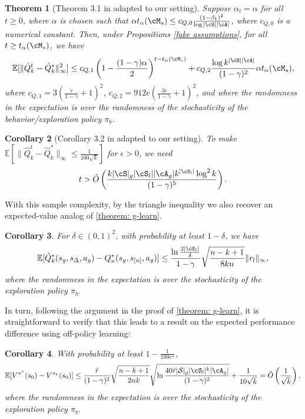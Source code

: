 \documentclass{article}
\theoremstyle{plain}
\newtheorem{theorem}{Theorem}[section]
\newtheorem{corollary}[theorem]{Corollary}
\theoremstyle{definition}
\def\E{\mathbb{E}}
\begin{document}
\begin{theorem}[Theorem 3.1 in \citet{chen2021lyapunov} adapted to our setting] Suppose $\alpha_t = \alpha$ for all $t\geq 0$, where $\alpha$ is chosen such that $\alpha t_\alpha(\cM_{s}) \leq c_{Q,0} \frac{(1-\beta_1)^2}{\log |\cS||\cA|}$, where $c_{Q,0}$ is a numerical constant. Then, under Propositions \ref{fake assumptions}, for all $t\geq t_\alpha(\cM_{s})$, we have
\begin{equation}\E[\|\hat{Q}^t_k - \hat{Q}_k^*\|^2_\infty] \leq c_{Q,1}\left(1 - \frac{(1-\gamma)\alpha}{2}\right)^{t-t_\alpha(\cM_{s})} + c_{Q,2} \frac{\log k^{|\cS| |\cA|}}{(1-\gamma)^2}\alpha t_\alpha(\cM_{s}),\end{equation}
    where $c_{Q,1} = 3(\frac{\tilde{r}}{1-\gamma} + 1)^2$, $c_{Q,2} = 912e(\frac{3\tilde{r}}{1-\gamma} + 1)^2$, and where the randomness in the expectation is over the randomness of the stochasticity of the behavior/exploration policy $\pi_b$.\\
\end{theorem}

\begin{corollary}[Corollary 3.2 in \citet{chen2021lyapunov} adapted to our setting] To make $\E[\|\hat{Q}_k^t - \hat{Q}_k^*\|_\infty \leq \frac{1}{100\sqrt{k}}]$ for $\epsilon>0$, we need 
\begin{equation}t>\tilde{O}\left(\frac{ k |\cS|_g |\cS_l| |\cA_g| k^{|\cS_l|} \log^2 k}{(1-\gamma)^5}\right).
\end{equation}
\end{corollary}
With this sample complexity, by the triangle inequality we also recover an expected-value analog of \cref{theorem: g-learn}.\\

\begin{corollary}For $\delta\in(0,1)^2$, with probability at least $1-\delta$, we have
    \begin{equation}\E[\hat{Q}_k^*(s_g, s_\Delta, a_g) - Q_n^*(s_g, s_{[n]}, a_g)] \leq \frac{\ln \frac{2|\cS_l|}{\delta}}{1-\gamma}\sqrt{\frac{n-k+1}{8k n}}\|r_l\|_\infty,\end{equation}
    where the randomness in the expectation is over the stochasticity of the exploration policy $\pi_b$.
\end{corollary}
In turn, following the argument in the proof of \cref{theorem: g-learn}, it is straightforward to verify that this leads to a result on the expected performance difference using off-policy learning:
\begin{corollary}\label{offpolicy-result} With probability at least $1 - \frac{1}{100e^\kappa}$,
\begin{equation}\E[V^{\pi^*}(s_0) - V^{\pi_{k}}(s_0)] \leq \frac{\tilde{r}}{(1-\gamma)^2}\sqrt{\frac{n-k+1}{2nk}} \sqrt{\ln\frac{40\tilde{r}|\mathcal{S}|_g |\cS_l|^k |\cA_g|}{(1-\gamma)^2}}  + \frac{1}{10\sqrt{k}}  = \tilde{O}\left(\frac{1}{\sqrt{k}}\right),\end{equation}
where the randomness in the expectation is over the stochasticity of the exploration policy $\pi_b$.\\
\end{corollary}
\end{document}
